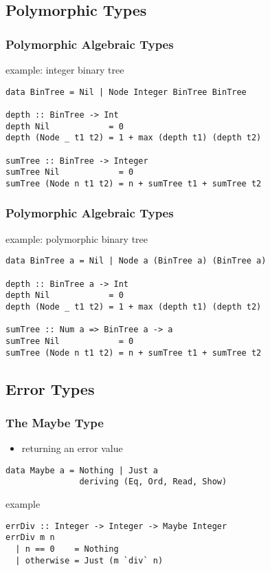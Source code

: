 \documentclass[dvipsnames]{beamer}
\theoremstyle{plain}
\begin{document}
\subsection{Polymorphic Types}

\begin{frame}[fragile]
  \frametitle{Polymorphic Algebraic Types}

  \begin{exampleblock}{example: integer binary tree}
    \begin{lstlisting}
data BinTree = Nil | Node Integer BinTree BinTree

depth :: BinTree -> Int
depth Nil            = 0
depth (Node _ t1 t2) = 1 + max (depth t1) (depth t2)

sumTree :: BinTree -> Integer
sumTree Nil            = 0
sumTree (Node n t1 t2) = n + sumTree t1 + sumTree t2
    \end{lstlisting}
  \end{exampleblock}
\end{frame}

\begin{frame}[fragile]
  \frametitle{Polymorphic Algebraic Types}

  \begin{exampleblock}{example: polymorphic binary tree}
    \begin{lstlisting}
data BinTree a = Nil | Node a (BinTree a) (BinTree a)

depth :: BinTree a -> Int
depth Nil            = 0
depth (Node _ t1 t2) = 1 + max (depth t1) (depth t2)

sumTree :: Num a => BinTree a -> a
sumTree Nil            = 0
sumTree (Node n t1 t2) = n + sumTree t1 + sumTree t2
    \end{lstlisting}
  \end{exampleblock}
\end{frame}

\subsection{Error Types}

\begin{frame}[fragile]
  \frametitle{The Maybe Type}

  \begin{itemize}
    \item returning an error value
  \end{itemize}

  \begin{lstlisting}
data Maybe a = Nothing | Just a
               deriving (Eq, Ord, Read, Show)
  \end{lstlisting}

  \begin{exampleblock}{example}
    \begin{lstlisting}
errDiv :: Integer -> Integer -> Maybe Integer
errDiv m n
  | n == 0    = Nothing
  | otherwise = Just (m `div` n)
    \end{lstlisting}
  \end{exampleblock}
\end{frame}
\end{document}
